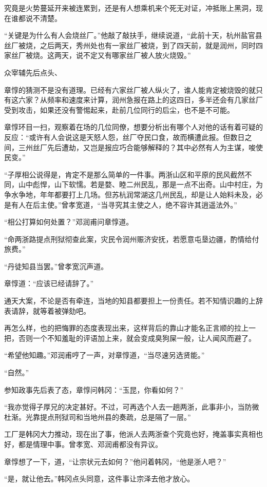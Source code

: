 究竟是火势蔓延开来被连累到，还是有人想乘机来个死无对证，冲抵账上黑洞，现在谁都说不清楚。

“关键是为什么有人会烧丝厂。”他敲了敲扶手，继续说道，“此前十天，杭州盐官县丝厂被烧，之后两天，秀州处也有一家丝厂被烧，到了四天前，就是润州，同时四家丝厂被烧。这两天，说不定又有哪家丝厂被人放火烧毁。”

众宰辅先后点头、

章惇的猜测不是没有道理。已经有六家丝厂被人纵火了，谁人能肯定被烧毁的就只有这六家？从频率和速度来计算，润州急报在路上的这四日，多半还会有几家丝厂受到攻击，如果还没有警惕起来，赴前几位同行的后尘，也不是不可能。

章惇环目一扫，观察着在场的几位同僚，想要分析出有哪个人对他的话有着可疑的反应：“或许有人会说这是天怒人怨，丝厂夺民口食，故而横遭此报。但数日之间，三州丝厂先后遭劫，又岂是报应巧合能够解释的？其中必然有人为主谋，唆使民变。”

“子厚相公说得是，肯定不是那么简单的一件事。两浙山区和平原的民风截然不同，山中彪悍，山下软懦。若是婺、睦二州民乱，那是一点不出奇。山中村庄，为争水争地，年年都要打上几场。但苏杭润常湖这几州民乱，却是让人始料未及，必是有人在后主使。”曾孝宽道，“当寻究其主使之人，绝不容许其逍遥法外。”

“相公打算如何处置？”邓润甫问章惇道。

“命两浙路提点刑狱彻查此案，灾民令润州赈济安抚，若愿意屯垦边疆，酌情给付旅费。”

“丹徒知县当罢。”曾孝宽沉声道。

章惇道：“应该已经请辞了。”

通天大案，不论是否有牵连，当地的知县都要担上一份责任。若不知情识趣的上辞表请辞，就等着被弹劾吧。

再怎么样，也的把悔罪的态度表现出来，这样背后的靠山才能名正言顺的拉上一把，否则一个不知羞耻的评语加上来，就会变成臭狗屎一般，让人闻风而避了。

“希望他知趣。”邓润甫哼了一声，对章惇道，“当尽速另选贤能。”

“自然。”

参知政事先后表了态，章惇问韩冈：“玉昆，你看如何？”

“我亦觉得子厚兄的决定甚好。不过，可再选个人去一趟两浙，此事非小，当防微杜渐。光靠提点刑狱司和当地州县的奏疏，总是隔了一层。”

工厂是韩冈大力推动，现在出了事，他派人去两浙查个究竟也好，掩盖事实真相也好，都是情理中事。曾孝宽、邓润甫都没有异议。

章惇想了一下，道，“让宗状元去如何？”他问着韩冈，“他是浙人吧？”

“是，就让他去。”韩冈点头同意，这件事让宗泽去他才放心。

